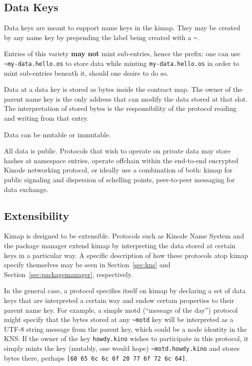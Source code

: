 \documentclass[runningheads]{llncs}
\begin{document}
\subsection{Data Keys}

Data keys are meant to support name keys in the kimap. They may be created by any name key by prepending the label being created with a \verb|~|.

Entries of this variety \textbf{may not} mint sub-entries, hence the prefix: one can use \verb|~my-data.hello.os| to store data while minting \verb|my-data.hello.os| in order to mint sub-entries beneath it, should one desire to do so.

Data at a data key is stored as bytes inside the contract map.
The owner of the parent name key is the only address that can modify the data stored at that slot.
The interpretation of stored bytes is the responsibility of the protocol reading and writing from that entry.

Data can be mutable or immutable.

All data is public. Protocols that wish to operate on private data may store hashes at namespace entries, operate offchain within the end-to-end encrypted Kinode networking protocol, or ideally use a combination of both: kimap for public signaling and dispersion of schelling points, peer-to-peer messaging for data exchange.

\subsection{Extensibility}
\label{sec:extensibility}

Kimap is designed to be extensible.
Protocols such as Kinode Name System and the package manager extend kimap by interpreting the data stored at certain keys in a particular way.
A specific description of how these protocols atop kimap specify themselves may be seen in Section~\ref{sec:kns} and Section~\ref{sec:packagemanager}, respectively.

In the general case, a protocol specifies itself on kimap by declaring a set of data keys that are interpreted a certain way and endow certain properties to their parent name key.
For example, a simple motd (``message of the day'') protocol might specify that the bytes stored at any \verb|~motd| key will be interpreted as a UTF-8 string message from the parent key, which could be a node identity in the KNS.
If the owner of the key \verb|howdy.kino| wishes to participate in this protocol, it simply mints the key (mutably, one would hope) \verb|~motd.howdy.kino| and stores bytes there, perhaps \verb|[68 65 6c 6c 6f 20 77 6f 72 6c 64]|.
\end{document}
